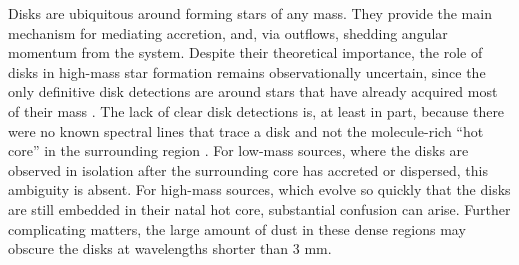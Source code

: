 \documentclass[twocolumn]{aastex62}
\newcommand{\sourcei}{SrcI\xspace}
\newcommand{\rlp}[1]{\textcolor{red!65!black}{\textbf{[RLP: #1]}}}
\begin{document}



Disks are ubiquitous around forming stars of any mass.  They provide the main
mechanism for mediating accretion, and, via outflows, shedding angular momentum
from the system.  Despite their theoretical importance, the role of disks in
high-mass star formation remains observationally uncertain, since the only
definitive disk detections are around stars that have already acquired most of
their mass \citep[e.g.,][]{Girart2017a}.  The lack of clear disk detections
is, at least in part, because there were no known spectral lines that trace a
disk and not the molecule-rich ``hot core'' in the surrounding region
\cite{Goddi2018a,Cesaroni2017a}.  For low-mass sources, where the disks are
observed in isolation after the surrounding core has accreted or dispersed,
this ambiguity is absent.  For high-mass sources, which evolve so quickly that
the disks are still embedded in their natal hot core, substantial confusion can
arise.  Further complicating matters, the large amount of dust in these dense
regions may obscure the disks at wavelengths shorter than 3 mm.
\end{document}
